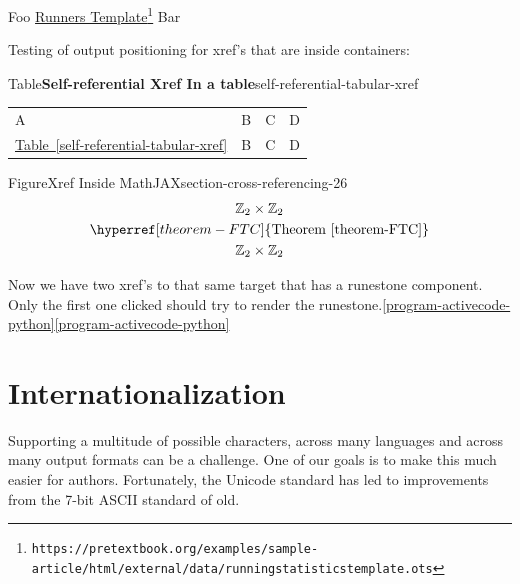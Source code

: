 \documentclass{amsart}
\theoremstyle{plain}%
\theoremstyle{definition}%
\theoremstyle{remark}%
\newcommand{\tabularfont}{\relax}
\newcommand{\xreffont}{\relax}
\numberwithin{equation}{section}
\newcommand{\hrulemedium}{\noalign{\hrule height 0.07em}}
\begin{document}
\par
Foo \href{https://pretextbook.org/examples/sample-article/html/external/data/runningstatisticstemplate.ots}{Runners Template}\footnote{\nolinkurl{https://pretextbook.org/examples/sample-article/html/external/data/runningstatisticstemplate.ots}\label{section-cross-referencing-23-2}} Bar%
\par
Testing of output positioning for xref's that are inside containers:%
\begin{tableptx}{Table}{\textbf{Self-referential Xref In a table}}{self-referential-tabular-xref}{}%
\centering%
{\tabularfont%
\begin{tabular}{llll}
A&B&C&D\tabularnewline\hrulemedium
\hyperref[self-referential-tabular-xref]{Table~{\xreffont\ref{self-referential-tabular-xref}}}&B&C&D
\end{tabular}
}%
\end{tableptx}%
\begin{figureptx}{Figure}{Xref Inside MathJAX}{section-cross-referencing-26}{}%
\centering
%
\begin{gather*}
{\mathbb Z}_2 \times {\mathbb Z}_2\\
\hyperref[theorem-FTC]{\text{Theorem {\xreffont\ref{theorem-FTC}}}}\\
{\mathbb Z}_2 \times {\mathbb Z}_2
\end{gather*}
%
\tcblower
\end{figureptx}%
Now we have two xref's to that same target that has a runestone component. Only the first one clicked should try to render the runestone.\hyperref[program-activecode-python]{{\xreffont\ref{program-activecode-python}}}\hyperref[program-activecode-python]{{\xreffont\ref{program-activecode-python}}}%
%
%
\typeout{************************************************}
\typeout{************************************************}
%
\section{Internationalization}\label{section-internationalization}%
%
Supporting a multitude of possible characters, across many languages and across many output formats can be a challenge.  One of our goals is to make this much easier for authors.  Fortunately, the Unicode standard has led to improvements from the 7-bit ASCII standard of old.%
\end{document}
